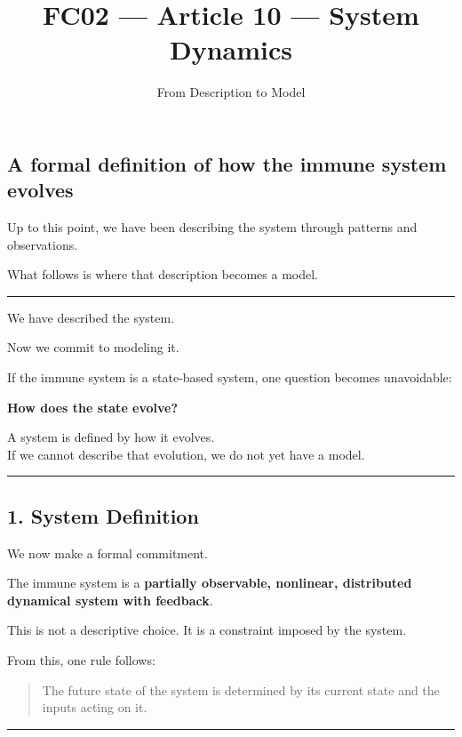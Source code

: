 \documentclass[
  letterpaper,
  DIV=11,
  numbers=noendperiod]{scrartcl}
\title{FC02 --- Article 10 --- System Dynamics}
\subtitle{From Description to Model}
\author{}
\date{}
\begin{document}
\maketitle


\subsection{A formal definition of how the immune system
evolves}\label{a-formal-definition-of-how-the-immune-system-evolves}

Up to this point, we have been describing the system through patterns
and observations.

What follows is where that description becomes a model.

\begin{center}\rule{0.5\linewidth}{0.5pt}\end{center}

We have described the system.

Now we commit to modeling it.

If the immune system is a state-based system, one question becomes
unavoidable:

\textbf{How does the state evolve?}

A system is defined by how it evolves.\\
If we cannot describe that evolution, we do not yet have a model.

\begin{center}\rule{0.5\linewidth}{0.5pt}\end{center}

\subsection{1. System Definition}\label{system-definition}

We now make a formal commitment.

The immune system is a \textbf{partially observable, nonlinear,
distributed dynamical system with feedback}.

This is not a descriptive choice. It is a constraint imposed by the
system.

From this, one rule follows:

\begin{quote}
The future state of the system is determined by its current state and
the inputs acting on it.
\end{quote}

\begin{center}\rule{0.5\linewidth}{0.5pt}\end{center}
\end{document}

